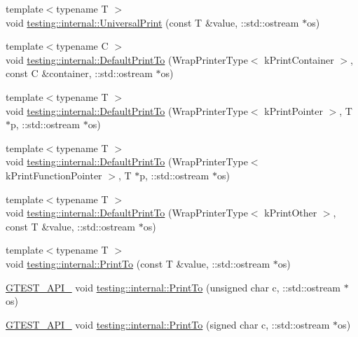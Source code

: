 \begin{DoxyCompactItemize}
{\footnotesize template$<$typename T $>$ }\\void \hyperlink{namespacetesting_1_1internal_a30708fa2bacf11895b03bdb21eb72309}{testing\+::internal\+::\+Universal\+Print} (const T \&value, \+::std\+::ostream $\ast$os)
\item 
{\footnotesize template$<$typename C $>$ }\\void \hyperlink{namespacetesting_1_1internal_a2e96c98d5bd8ee4a1b92f8e3cde7dd40}{testing\+::internal\+::\+Default\+Print\+To} (Wrap\+Printer\+Type$<$ k\+Print\+Container $>$, const C \&container, \+::std\+::ostream $\ast$os)
\item 
{\footnotesize template$<$typename T $>$ }\\void \hyperlink{namespacetesting_1_1internal_a074522dd8d77d61878a042b8d05cc64a}{testing\+::internal\+::\+Default\+Print\+To} (Wrap\+Printer\+Type$<$ k\+Print\+Pointer $>$, T $\ast$p, \+::std\+::ostream $\ast$os)
\item 
{\footnotesize template$<$typename T $>$ }\\void \hyperlink{namespacetesting_1_1internal_a7729c07abcae6c69b9b370c39db61409}{testing\+::internal\+::\+Default\+Print\+To} (Wrap\+Printer\+Type$<$ k\+Print\+Function\+Pointer $>$, T $\ast$p, \+::std\+::ostream $\ast$os)
\item 
{\footnotesize template$<$typename T $>$ }\\void \hyperlink{namespacetesting_1_1internal_a72b1a69d96be8ea6382539f5c4fcac6d}{testing\+::internal\+::\+Default\+Print\+To} (Wrap\+Printer\+Type$<$ k\+Print\+Other $>$, const T \&value, \+::std\+::ostream $\ast$os)
\item 
{\footnotesize template$<$typename T $>$ }\\void \hyperlink{namespacetesting_1_1internal_adb3c27150dbe661db0e0c4be27533460}{testing\+::internal\+::\+Print\+To} (const T \&value, \+::std\+::ostream $\ast$os)
\item 
\hyperlink{gtest-port_8h_aa73be6f0ba4a7456180a94904ce17790}{G\+T\+E\+S\+T\+\_\+\+A\+P\+I\+\_\+} void \hyperlink{namespacetesting_1_1internal_aa7e70a85d66f0c109e3e69629ef577f2}{testing\+::internal\+::\+Print\+To} (unsigned char c, \+::std\+::ostream $\ast$os)
\item 
\hyperlink{gtest-port_8h_aa73be6f0ba4a7456180a94904ce17790}{G\+T\+E\+S\+T\+\_\+\+A\+P\+I\+\_\+} void \hyperlink{namespacetesting_1_1internal_abf6c518b437569187c1218166c702807}{testing\+::internal\+::\+Print\+To} (signed char c, \+::std\+::ostream $\ast$os)
\item 

\end{DoxyCompactItemize}

